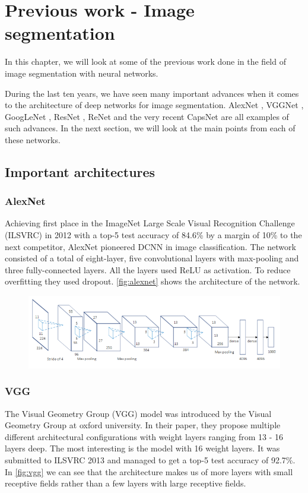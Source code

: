 \chapter{Previous work - Image segmentation}\label{sec:previous-work-segmentation}
In this chapter, we will look at some of the previous work done in the field of image segmentation with neural networks. 

During the last ten years, we have seen many important advances when it comes to the architecture of deep networks for image segmentation. AlexNet \cite{Krizhevsky2012}, VGGNet \cite{Simonyan2014a}, GoogLeNet \cite{Szegedy2014}, ResNet \cite{He2015}, ReNet \cite{Visin2015} and the very recent CapsNet \cite{Sabour2017} are all examples of such advances. In the next section, we will look at the main points from each of these networks.

\section{Important architectures}\label{sec:important-architectures}

\subsection{AlexNet}
Achieving first place in the ImageNet Large Scale Visual Recognition Challenge (ILSVRC) \cite{Russakovsky2015}  in 2012 with a top-5 test accuracy of 84.6\% by a margin of 10\% to the next competitor, AlexNet pioneered DCNN in image classification. The network consisted of a total of eight-layer, five convolutional layers with max-pooling and three fully-connected layers. All the layers used ReLU as activation. To reduce overfitting they used dropout. \autoref{fig:alexnet} shows the architecture of the network.

\begin{figure}[H]
	\centering
	\includegraphics[width=0.7\linewidth]{fig/alexnet.png}
	\label{fig:alexnet}
\end{figure}


\subsection{VGG}
The Visual Geometry Group (VGG) model was introduced by the Visual Geometry Group at oxford university. In their paper, they propose multiple different architectural configurations with weight layers ranging from 13 - 16 layers deep. The most interesting is the model with 16 weight layers. It was submitted to ILSVRC 2013 and managed to get a top-5 test accuracy of 92.7\%. In \autoref{fig:vgg} we can see that the architecture makes us of more layers with small receptive fields rather than a few layers with large receptive fields.

